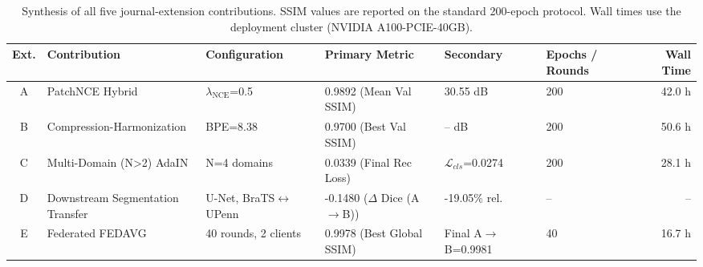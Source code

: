 \begin{table}[t]
\centering
\caption{Synthesis of all five journal-extension contributions. SSIM values are reported on the standard 200-epoch protocol. Wall times use the deployment cluster (NVIDIA A100-PCIE-40GB).}
\label{tab:cross_extension}
\begin{tabular}{clllllr}
\toprule
Ext. & Contribution & Configuration & Primary Metric & Secondary & Epochs / Rounds & Wall Time \\
\midrule
A & PatchNCE Hybrid & $\lambda_{\mathrm{NCE}}$=0.5 & 0.9892 (Mean Val SSIM) & 30.55 dB & 200 & 42.0 h \\
B & Compression-Harmonization & BPE=8.38 & 0.9700 (Best Val SSIM) & -- dB & 200 & 50.6 h \\
C & Multi-Domain (N>2) AdaIN & N=4 domains & 0.0339 (Final Rec Loss) & $\mathcal{L}_{cls}$=0.0274 & 200 & 28.1 h \\
D & Downstream Segmentation Transfer & U-Net, BraTS$\leftrightarrow$UPenn & -0.1480 ($\Delta$ Dice (A$\rightarrow$B)) & -19.05\% rel. & -- & -- \\
E & Federated FEDAVG & 40 rounds, 2 clients & 0.9978 (Best Global SSIM) & Final A$\rightarrow$B=0.9981 & 40 & 16.7 h \\
\bottomrule
\end{tabular}
\end{table}
